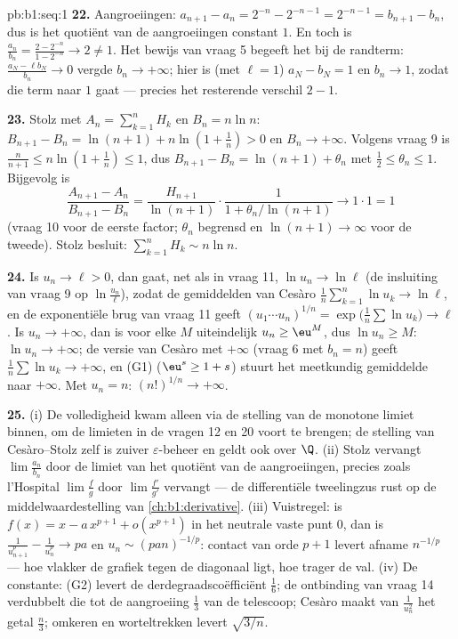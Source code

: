 \begin{solution}{pb:b1:seq:1}
\textbf{22.} Aangroeiingen: $a_{n+1} - a_n = 2^{-n} - 2^{-n-1} =
2^{-n-1} = b_{n+1} - b_n$, dus is het quotiënt van de aangroeiingen
constant $1$. En toch is $\frac{a_n}{b_n} = \frac{2 - 2^{-n}}{1 - 2^{-n}}
\to 2 \neq 1$. Het bewijs van vraag 5 begeeft het bij de randterm:
$\frac{a_N - \ell b_N}{b_n} \to 0$ vergde $b_n \to +\infty$; hier is (met
$\ell = 1$) $a_N - b_N = 1$ en $b_n \to 1$, zodat die term naar $1$ gaat
--- precies het resterende verschil $2 - 1$.

\textbf{23.} Stolz met $A_n = \sum_{k=1}^n H_k$ en $B_n = n\ln n$:
$B_{n+1} - B_n = \ln(n+1) + n\ln(1 + \frac1n) > 0$ en $B_n \to +\infty$.
Volgens vraag 9 is $\frac{n}{n+1} \leq n\ln(1 + \frac1n) \leq 1$, dus
$B_{n+1} - B_n = \ln(n+1) + \theta_n$ met $\frac12 \leq \theta_n \leq 1$.
Bijgevolg is
\[
\frac{A_{n+1} - A_n}{B_{n+1} - B_n}
= \frac{H_{n+1}}{\ln(n+1)}\cdot
\frac{1}{1 + \theta_n/\ln(n+1)} \longrightarrow 1 \cdot 1 = 1
\]
(vraag 10 voor de eerste factor; $\theta_n$ begrensd en $\ln(n+1) \to
\infty$ voor de tweede). Stolz besluit: $\sum_{k=1}^n H_k \sim n\ln n$.

\textbf{24.} Is $u_n \to \ell > 0$, dan gaat, net als in vraag 11, $\ln
u_n \to \ln\ell$ (de insluiting van vraag 9 op $\ln\frac{u_n}{\ell}$),
zodat de gemiddelden van Cesàro $\frac1n\sum_{k=1}^n \ln u_k \to
\ln\ell$, en de exponentiële brug van vraag 11 geeft $(u_1\cdots
u_n)^{1/n} = \exp\bigl(\frac1n\sum\ln u_k\bigr) \to \ell$. Is $u_n \to
+\infty$, dan is voor elke $M$ uiteindelijk $u_n \geq \eu^M$, dus $\ln
u_n \geq M$: $\ln u_n \to +\infty$; de versie van Cesàro met $+\infty$
(vraag 6 met $b_n = n$) geeft $\frac1n\sum \ln u_k \to +\infty$, en (G1)
($\eu^s \geq 1 + s$) stuurt het meetkundig gemiddelde naar $+\infty$. Met
$u_n = n$: $(n!)^{1/n} \to +\infty$.

\textbf{25.} (i) De volledigheid kwam alleen via de stelling van de
monotone limiet binnen, om de limieten in de vragen 12 en 20 voort te
brengen; de stelling van Cesàro--Stolz zelf is zuiver
$\varepsilon$-beheer en geldt ook over $\Q$. (ii) Stolz vervangt $\lim
\frac{a_n}{b_n}$ door de limiet van het quotiënt van de aangroeiingen,
precies zoals l'Hospital $\lim\frac fg$ door $\lim\frac{f'}{g'}$ vervangt
--- de differentiële tweelingzus rust op de middelwaardestelling van
\cref{ch:b1:derivative}. (iii) Vuistregel: is $f(x) = x - a\,x^{p+1} +
o(x^{p+1})$ in het neutrale vaste punt $0$, dan is $\frac{1}{u_{n+1}^p} -
\frac{1}{u_n^p} \to pa$ en $u_n \sim (pan)^{-1/p}$: contact van orde $p +
1$ levert afname $n^{-1/p}$ --- hoe vlakker de grafiek tegen de diagonaal
ligt, hoe trager de val. (iv) De constante: (G2) levert de
derdegraadscoëfficiënt $\frac16$; de ontbinding van vraag 14 verdubbelt
die tot de aangroeiing $\frac13$ van de telescoop; Cesàro maakt van
$\frac{1}{u_n^2}$ het getal $\frac n3$; omkeren en worteltrekken levert
$\sqrt{3/n}$.
\end{solution}
